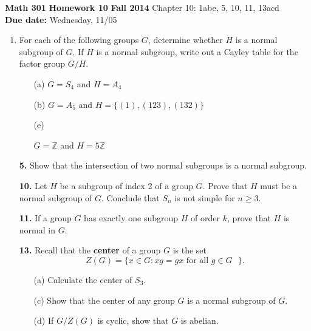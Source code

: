 \documentclass[12pt,reqno]{amsart}
\newcommand{\<}{\ensuremath{\langle}}
\renewcommand{\>}{\ensuremath{\rangle}}
\begin{document}
\thispagestyle{empty}

\noindent \textbf{Math 301} \hskip5cm {\bf Homework 10} \hfill {\bf Fall 2014}
\vskip1cm
 Chapter 10: 1abe, 5, 10, 11, 13acd\\
{\bf Due date:} Wednesday, 11/05

\bigskip

\begin{enumerate}[{\bf 1.}]
\item For each of the following groups $G$, determine whether $H$ is a normal
subgroup of $G$. If $H$ is a normal subgroup, write out a Cayley table
for the factor group $G/H$.
\begin{enumerate}
\item[(a)]
$G = S_4$ and $H = A_4$
 \item[(b)]
$G = A_5$ and $H = \{ (1), (123), (132) \}$
\item[(e)]

$G = {\mathbb Z}$ and $H = 5 {\mathbb Z}$
 
\end{enumerate}

\bigskip

\item[{\bf 5.}]
Show that the intersection of two normal subgroups is a normal
subgroup. 
 
\bigskip

\item[{\bf 10.}]
Let $H$ be a subgroup of index 2 of a group $G$. Prove that $H$ must
be a normal subgroup of $G$. Conclude that $S_n$ is not simple for $n \geq 3$.

\bigskip

\item[{\bf 11.}]
If a group $G$ has exactly one subgroup $H$ of order $k$, prove that
$H$ is normal in $G$. 

\bigskip

\item[{\bf 13.}]
Recall that the {\bf center} of a group $G$ is the set 
\[
Z(G) = \{ x \in G : xg = gx \text{ for all $g \in G$ } \}.
\]
\begin{enumerate}
 
 \item[(a)]
Calculate the center of $S_3$.
 
 
 \item[(c)]
Show that the center of any group $G$ is a normal subgroup of $G$. 
 
 \item[(d)]
If $G / Z(G)$ is cyclic, show that $G$ is abelian.
 
\end{enumerate}
 
\end{enumerate}
\end{document}
